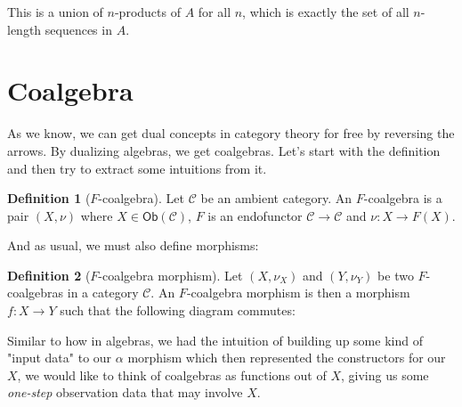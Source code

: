 \documentclass{article}
\theoremstyle{plain}
\theoremstyle{definition}
\newtheorem{definition}{Definition}
\begin{document}
This is a union of \ensuremath{n}-products of \ensuremath{A} for all \ensuremath{n}, which is exactly the set of all \ensuremath{n}-length sequences in \ensuremath{A}. 



  

   

 

      

 

\section{Coalgebra}


As we know, we can get dual concepts in category theory for free by reversing the arrows. By dualizing algebras, we get coalgebras. Let's start with the definition and then try to extract some intuitions from it.

\begin{definition}[\ensuremath{F}-coalgebra]
 Let \ensuremath{\mathcal{C}} be an ambient category. An \ensuremath{F}-coalgebra is a pair \ensuremath{\left( X, \nu \right)} where \ensuremath{X \in \mathsf{Ob}\left( \mathcal{C} \right)}, \ensuremath{F} is an endofunctor \ensuremath{\mathcal{C} \rightarrow \mathcal{C}} and \ensuremath{\nu : X \rightarrow F\left( X \right)}. 
\end{definition}


And as usual, we must also define morphisms:

\begin{definition}[\ensuremath{F}-coalgebra morphism]
 Let \ensuremath{\left( X, {\nu }_{X} \right)} and \ensuremath{\left( Y, {\nu }_{Y} \right)} be two \ensuremath{F}-coalgebras in a category \ensuremath{\mathcal{C}}. An \ensuremath{F}-coalgebra morphism is then a morphism \ensuremath{f : X \rightarrow Y} such that the following diagram commutes:


\begin{center}
\end{center}
 
\end{definition}
\label{fCoalgebraMorphism} 

Similar to how in algebras, we had the intuition of building up some kind of "input data" to our \ensuremath{\alpha} morphism which then represented the constructors for our \ensuremath{X}, we would like to think of coalgebras as functions out of \ensuremath{X}, giving us some \emph{one-step} observation data that may involve \ensuremath{X}.
\end{document}
